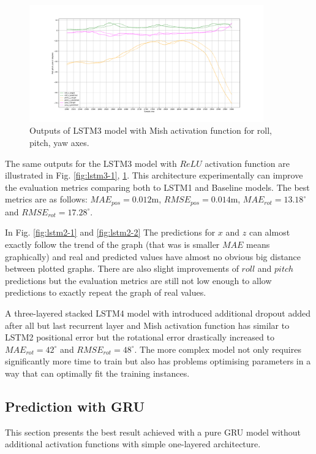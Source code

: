 \begin{figure}[b!]
	\begin{center}
		\includegraphics[width=0.9\textwidth, keepaspectratio]{gfx/lstm3_mish-roll_pitch_yaw.pdf}
		\caption{\label{fig:lstm3-2} Outputs of LSTM3 model with Mish activation function for roll, pitch, yaw axes.}
	\end{center}
\end{figure}

The same outputs for the LSTM3 model with $ReLU$ activation function are illustrated in Fig. \ref{fig:lstm3-1}, \ref{fig:lstm3-2}. This architecture experimentally can improve the evaluation metrics comparing both to LSTM1 and Baseline models. The best metrics are as follows: $MAE_{pos} = 0.012$m, $RMSE_{pos} = 0.014$m, $MAE_{rot} = 13.18^{\circ}$ and $RMSE_{rot} =17.28^{\circ}$.

In Fig. \ref{fig:lstm2-1} and \ref{fig:lstm2-2} The predictions for $x$ and $z$ can almost exactly follow the trend of the graph (that was is smaller $MAE$ means graphically) and real and predicted values have almost no obvious big distance between plotted graphs. There are also slight improvements of $roll$ and $pitch$ predictions but the evaluation metrics are still not low enough to allow predictions to exactly repeat the graph of real values. 

A three-layered stacked LSTM4 model with introduced additional dropout added after all but last recurrent layer and Mish activation function has similar to LSTM2 positional error but the rotational error drastically increased to $MAE_{rot} = 42^{\circ}$ and $RMSE_{rot} =48^{\circ}$. The more complex model not only requires significantly more time to train but also has problems optimising parameters in a way that can optimally fit the training instances. 

\subsection{Prediction with GRU}
\label{sec:eval:experiments:gru}
This section presents the best result achieved with a pure GRU model without additional activation functions with simple one-layered architecture. 

